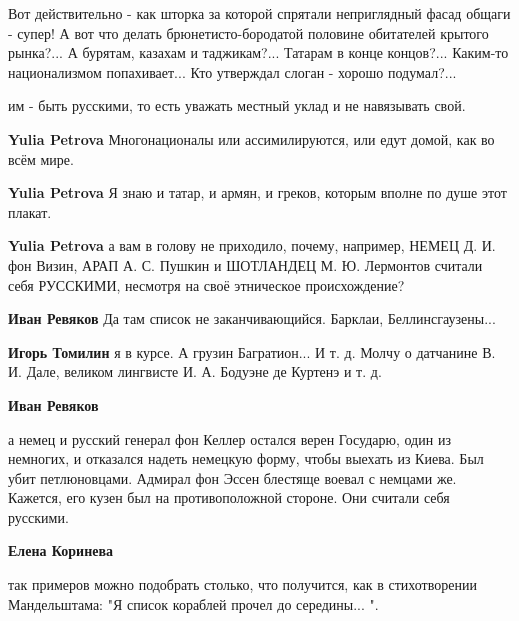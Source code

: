 \begin{itemize}
\begin{itemize}
\end{itemize} %


Вот действительно - как шторка за которой спрятали неприглядный фасад общаги -
супер! А вот что делать брюнетисто-бородатой половине обитателей крытого
рынка?... А бурятам, казахам и таджикам?... Татарам в конце концов?... Каким-то
национализмом попахивает... Кто утверждал слоган - хорошо подумал?...

\begin{itemize} %
им - быть русскими, то есть уважать местный уклад и не навязывать свой.

\textbf{Yulia Petrova} Многонационалы или ассимилируются, или едут домой, как во всём мире.

\textbf{Yulia Petrova} Я знаю и татар, и армян, и греков, которым вполне по душе этот плакат.

\textbf{Yulia Petrova} а вам в голову не приходило, почему, например, НЕМЕЦ Д. И. фон Визин, АРАП А. С. Пушкин и ШОТЛАНДЕЦ М. Ю. Лермонтов считали себя РУССКИМИ, несмотря на своё этническое происхождение?

\textbf{Иван Ревяков} Да там список не заканчивающийся. Барклаи, Беллинсгаузены...

\textbf{Игорь Томилин} я в курсе. А грузин Багратион... И т. д. Молчу о датчанине В. И. Дале, великом лингвисте И. А. Бодуэне де Куртенэ и т. д.

\textbf{Иван Ревяков} 

а немец и русский генерал фон Келлер остался верен Государю, один из немногих,
и отказался надеть немецкую форму, чтобы выехать из Киева. Был убит
петлюновцами. Адмирал фон Эссен блестяще воевал с немцами же. Кажется, его
кузен был на противоположной стороне. Они считали себя русскими.

\textbf{Елена Коринева} 

так примеров можно подобрать столько, что получится, как в стихотворении
Мандельштама: "Я список кораблей прочел до середины... ".

\end{itemize} %

\end{itemize} %
